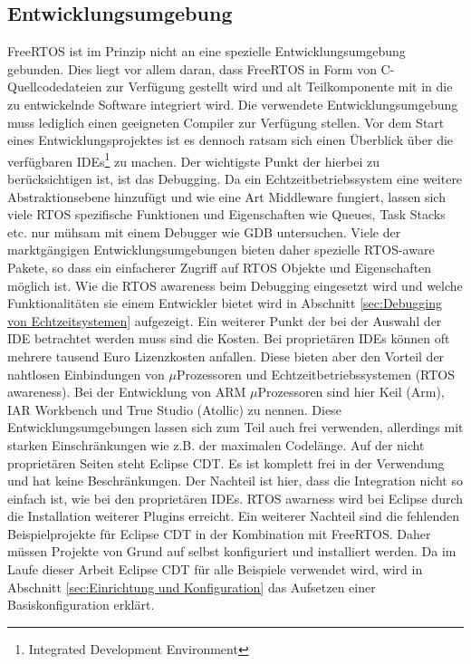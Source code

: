 \subsection{Entwicklungsumgebung}
FreeRTOS ist im Prinzip nicht an eine spezielle Entwicklungsumgebung gebunden. Dies liegt vor allem daran, dass FreeRTOS in Form von C-Quellcodedateien zur Verfügung gestellt wird und alt Teilkomponente mit in die zu entwickelnde Software integriert wird. Die verwendete Entwicklungsumgebung muss lediglich einen geeigneten Compiler zur Verfügung stellen. Vor dem Start eines Entwicklungsprojektes ist es dennoch ratsam sich einen Überblick über die ver\-fügbaren IDEs\footnote{Integrated Development Environment} zu machen. Der wichtigste Punkt der hierbei zu berücksichtigen ist, ist das Debugging. Da ein Echtzeitbetriebssystem eine weitere Abstraktionsebene hinzufügt und wie eine Art Middleware fungiert, lassen sich viele RTOS spezifische Funktionen und Eigenschaften wie Queues, Task Stacks etc. nur mühsam mit einem Debugger wie GDB untersuchen. Viele der marktgängigen Entwicklungsumgebungen bieten daher spezielle RTOS-aware Pakete, so dass ein einfacherer Zugriff auf RTOS Objekte und Eigenschaften möglich ist. Wie die RTOS awareness beim Debugging eingesetzt wird und welche Funktionalitäten sie einem Entwickler bietet wird in Abschnitt \ref{sec:Debugging von Echtzeitsystemen} aufgezeigt. Ein weiterer Punkt der bei der Auswahl der IDE betrachtet werden muss sind die Kosten. Bei proprietären IDEs können oft mehrere tausend Euro Lizenzkosten anfallen. Diese bieten aber den Vorteil der nahtlosen Einbindungen von $\mu$Prozessoren und Echtzeitbetriebssystemen (RTOS awareness). Bei der Entwicklung von ARM $\mu$\-Prozessoren sind hier Keil (Arm), IAR Workbench und True Studio (Atollic) zu nennen. Diese Entwicklungsumgebungen lassen sich zum Teil auch frei verwenden, allerdings mit starken Einschränkungen wie z.B. der maximalen Codelänge. Auf der nicht proprietären Seiten steht Eclipse CDT. Es ist komplett frei in der Verwendung und hat keine Beschränkungen. Der Nachteil ist hier, dass die Integration nicht so einfach ist, wie bei den proprietären IDEs. RTOS awarness wird bei Eclipse durch die Installation weiterer Plugins erreicht. Ein weiterer Nachteil sind die fehlenden Beispielprojekte für Eclipse CDT in der Kombination mit FreeRTOS. Daher müssen Projekte von Grund auf selbst konfiguriert und installiert werden. Da im Laufe dieser Arbeit Eclipse CDT für alle Beispiele verwendet wird, wird in Abschnitt \ref{sec:Einrichtung und Konfiguration} das Aufsetzen einer Basiskonfiguration erklärt. 
